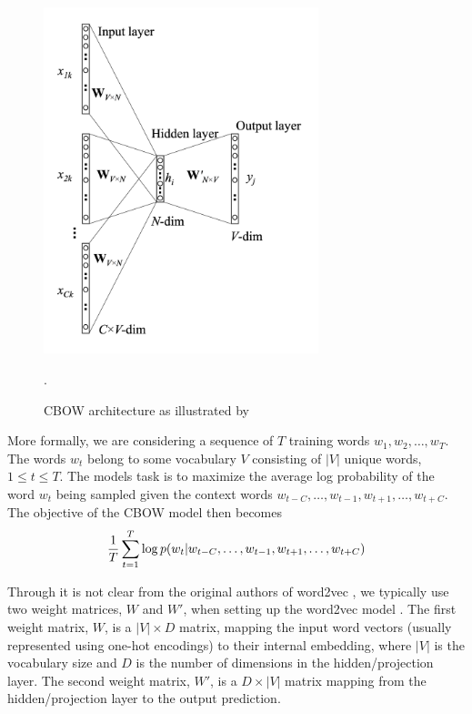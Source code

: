\begin{figure}[ht]
    \centering
    \includegraphics[width=8cm]{thesis/figures/cbow-rong-2016.png}
    \caption{CBOW architecture as illustrated by \cite{rong2016word2vec}}.
    \label{fig:cbow-model}
\end{figure}


More formally, we are considering a sequence of $T$ training words $w_1, w_2, \ldots, w_T$. The words $w_t$ belong to some vocabulary $V$ consisting of $|V|$ unique words, $1 \leq t \leq T$. The models task is to maximize the average log probability of the word $w_t$ being sampled given the context words $w_{t-C}, \ldots, w_{t-1}, w_{t+1}, \ldots, w_{t+C}$. The objective of the CBOW model then becomes
\begin{align}
    \frac{1}{T} \sum\limits_{t=1}^{T} \log p(w_t | w_{t-C}, \ldots, w_{t-1}, w_{t+1}, \ldots, w_{t+C})
    \label{eqn:cbow-objective-function}
\end{align}


Through it is not clear from the original authors of word2vec \cite{mikolov2013a, mikolov2013b}, we typically use two weight matrices, $W$ and $W'$, when setting up the word2vec model \cite{rong2016word2vec}. The first weight matrix, $W$, is a $|V| \times D$ matrix, mapping the input word vectors (usually represented using one-hot encodings) to their internal embedding, where $|V|$ is the vocabulary size and $D$ is the number of dimensions in the hidden/projection layer. The second weight matrix, $W'$, is a $D \times |V|$ matrix mapping from the hidden/projection layer to the output prediction.

